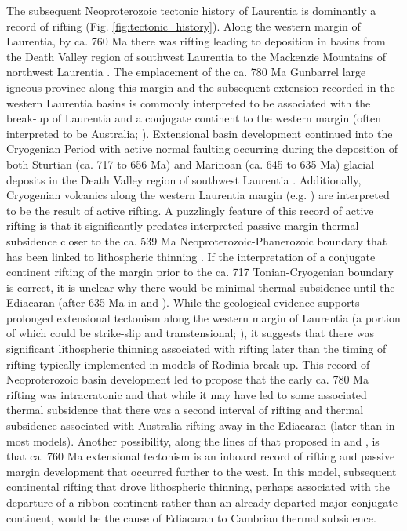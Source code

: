 \documentclass[twocolumn, switch]{article} %
\begin{document}
The subsequent Neoproterozoic tectonic history of Laurentia is dominantly a record of rifting (Fig. \ref{fig:tectonic_history}). Along the western margin of Laurentia, by ca. 760 Ma there was rifting leading to deposition in basins from the Death Valley region of southwest Laurentia to the Mackenzie Mountains of northwest Laurentia \citep{Macdonald2013a, Dehler2017a, Rooney2017a}. The emplacement of the ca. 780 Ma Gunbarrel large igneous province \citep{Harlan2003a} along this margin and the subsequent extension recorded in the western Laurentia basins is commonly interpreted to be associated with the break-up of Laurentia and a conjugate continent to the western margin (often interpreted to be Australia; \citealp{Li2008a}). Extensional basin development continued into the Cryogenian Period with active normal faulting occurring during the deposition of both Sturtian (ca. 717 to 656 Ma) and Marinoan (ca. 645 to 635 Ma) glacial deposits in the Death Valley region of southwest Laurentia \citep{Nelson2020a}. Additionally, Cryogenian volcanics along the western Laurentia margin (e.g. \citealp{Eyster2018a}) are interpreted to be the result of active rifting.  A puzzlingly feature of this record of active rifting is that it significantly predates interpreted passive margin thermal subsidence closer to the ca. 539 Ma Neoproterozoic-Phanerozoic boundary that has been linked to lithospheric thinning \citep{Bond1984a, Levy1991a}. If the interpretation of a conjugate continent rifting of the margin prior to the ca. 717 Tonian-Cryogenian boundary is correct, it is unclear why there would be minimal thermal subsidence until the Ediacaran (after 635 Ma in \citealp{Levy1991a} and \citealp{Witkosky2018a}). While the geological evidence supports prolonged extensional tectonism along the western margin of Laurentia (a portion of which could be strike-slip and transtensional; \citealp{Smith2015b}), it suggests that there was significant lithospheric thinning associated with rifting later than the timing of rifting typically implemented in models of Rodinia break-up. This record of Neoproterozoic basin development led \cite{Yonkee2014a} to propose that the early ca. 780 Ma rifting was intracratonic and that while it may have led to some associated thermal subsidence that there was a second interval of rifting and thermal subsidence associated with Australia rifting away in the Ediacaran (later than in most models). Another possibility, along the lines of that proposed in \citet{Ross1991a} and \citet{Colpron2002a}, is that ca. 760 Ma extensional tectonism is an inboard record of rifting and passive margin development that occurred further to the west. In this model, subsequent continental rifting that drove lithospheric thinning, perhaps associated with the departure of a ribbon continent rather than an already departed major conjugate continent, would be the cause of Ediacaran to Cambrian thermal subsidence.
\end{document}
